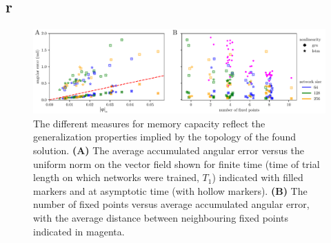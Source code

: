 \documentclass{article}
\begin{document}
\subsection*{r}
\begin{figure}[tbhp]
  \centering
  \includegraphics[width=\textwidth]{angular_losses_lstm_gru}
  \caption{The different measures for memory capacity reflect the generalization properties implied by the topology of the found solution.
    \textbf{(A)} The average accumulated angular error versus the uniform norm on the vector field shown for finite time (time of trial length on which networks were trained, \(T_1\)) indicated with filled markers and at asymptotic time (with hollow markers).
    \textbf{(B)}   The number of fixed points versus average accumulated angular error, with the average distance between neighbouring fixed points indicated in magenta.
}\label{fig:angular_losses_lstm_gru}
\end{figure}
\end{document}
